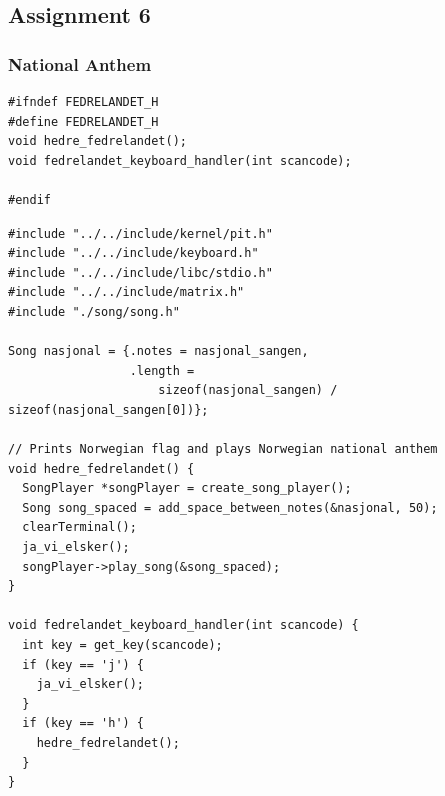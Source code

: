 \documentclass[../main.tex]{subfiles}
\begin{document}
\subsection{Assignment 6 }
\label{apx:assignment_6_}


\subsubsection{National Anthem }
\label{apx:national_anthem_}


\begin{listing}[H]
    \begin{verbatim}
#ifndef FEDRELANDET_H
#define FEDRELANDET_H
void hedre_fedrelandet();
void fedrelandet_keyboard_handler(int scancode);

#endif
    \end{verbatim}
    \caption{Implementation of \texttt{fedrelandet.h}}
    \label{lst:fedrelandet_h}
\end{listing}


\begin{listing}[H]
    \begin{verbatim}
#include "../../include/kernel/pit.h"
#include "../../include/keyboard.h"
#include "../../include/libc/stdio.h"
#include "../../include/matrix.h"
#include "./song/song.h"

Song nasjonal = {.notes = nasjonal_sangen,
                 .length =
                     sizeof(nasjonal_sangen) / sizeof(nasjonal_sangen[0])};

// Prints Norwegian flag and plays Norwegian national anthem
void hedre_fedrelandet() {
  SongPlayer *songPlayer = create_song_player();
  Song song_spaced = add_space_between_notes(&nasjonal, 50);
  clearTerminal();
  ja_vi_elsker();
  songPlayer->play_song(&song_spaced);
}

void fedrelandet_keyboard_handler(int scancode) {
  int key = get_key(scancode);
  if (key == 'j') {
    ja_vi_elsker();
  }
  if (key == 'h') {
    hedre_fedrelandet();
  }
}
    \end{verbatim}
    \caption{Implementation of \texttt{fedrelandet.c}}
    \label{lst:fedrelandet_c}
\end{listing}
\end{document}

